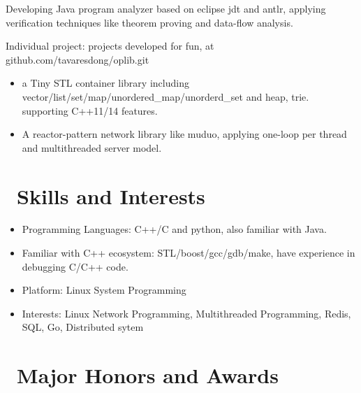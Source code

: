\documentclass{resume}
\begin{document}
Developing Java program analyzer based on eclipse jdt and
antlr, applying verification techniques like theorem proving and data-flow analysis.

Individual project: projects developed for fun, at
github.com/tavaresdong/oplib.git
\begin{itemize}
  \item a Tiny STL container library including vector/list/set/map/unordered\_map/unorderd\_set and heap, trie. supporting C++11/14 features.
  \item A reactor-pattern network library like muduo, applying one-loop per thread and multithreaded server model.
\end{itemize}

\section{\faCogs\ Skills and Interests}
\begin{itemize}[parsep=0.5ex]
  \item Programming Languages: C++/C and python, also familiar with Java.
  \item Familiar with C++ ecosystem: STL/boost/gcc/gdb/make, have experience in debugging C/C++ code.
  \item Platform: Linux System Programming
  \item Interests: Linux Network Programming, Multithreaded Programming, Redis, SQL, Go, Distributed sytem
\end{itemize}

\section{\faHeartO\ Major Honors and Awards}
\end{document}
